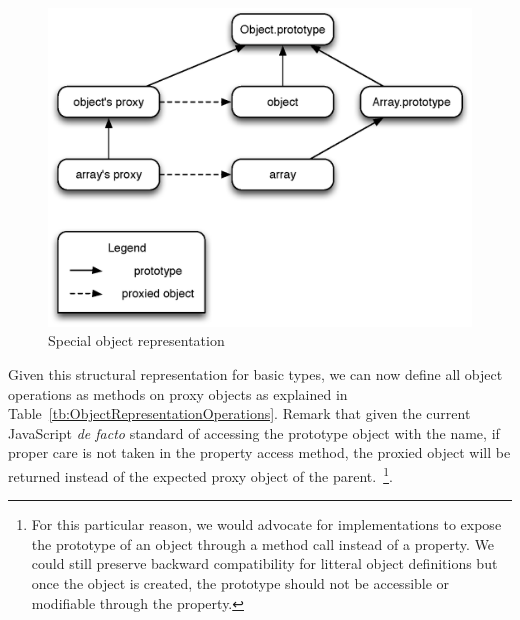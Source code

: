 \begin{figure}[htb]
\begin{center}
\includegraphics[scale=0.75]{figures/specialRepresentation}
\caption{\label{fig:SpecialRepresentation} Special object representation}
\end{center}
\end{figure}

Given this structural representation for basic types, we can now define all
object operations as methods on proxy objects as explained in
Table~\ref{tb:ObjectRepresentationOperations}. Remark that given the current
JavaScript \textit{de facto} standard of accessing the prototype object with
the  name, if proper care is not taken in the property access
method, the proxied object will be returned instead of the expected proxy
object of the parent.~\footnote{For this particular reason, we would advocate
for implementations to expose the prototype of an object through a method call
instead of a property. We could still preserve backward compatibility for
litteral object definitions but once the object is created, the prototype
should not be accessible or modifiable through the  property.}.

